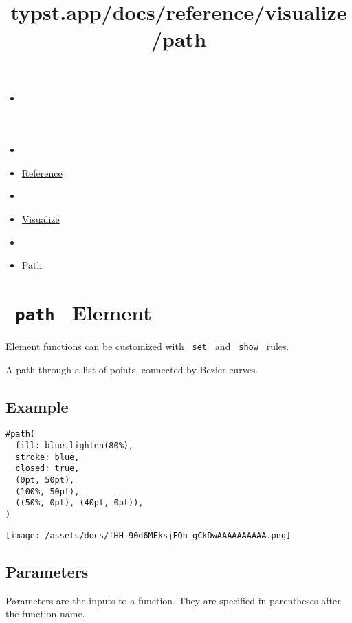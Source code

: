 \title{typst.app/docs/reference/visualize/path}

\begin{itemize}
\tightlist
\item
  \href{/docs}{}
\item
  
\item
  \href{/docs/reference/}{Reference}
\item
  
\item
  \href{/docs/reference/visualize/}{Visualize}
\item
  
\item
  \href{/docs/reference/visualize/path/}{Path}
\end{itemize}

\section{\texorpdfstring{\texttt{\ path\ } {{ Element
}}}{ path   Element }}\label{summary}

\label{element-tooltip}
Element functions can be customized with \texttt{\ set\ } and
\texttt{\ show\ } rules.

A path through a list of points, connected by Bezier curves.

\subsection{Example}\label{example}

\begin{verbatim}
#path(
  fill: blue.lighten(80%),
  stroke: blue,
  closed: true,
  (0pt, 50pt),
  (100%, 50pt),
  ((50%, 0pt), (40pt, 0pt)),
)
\end{verbatim}

\texttt{[image: /assets/docs/fHH\_90d6MEksjFQh\_gCkDwAAAAAAAAAA.png]}

\subsection{\texorpdfstring{{ Parameters
}}{ Parameters }}\label{parameters}

\label{parameters-tooltip}
Parameters are the inputs to a function. They are specified in
parentheses after the function name.

